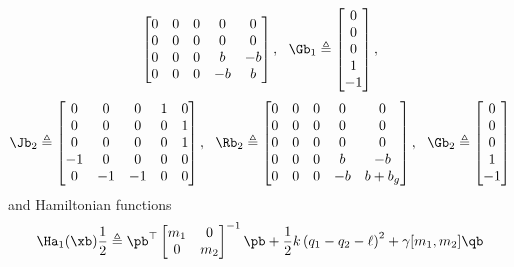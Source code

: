 \begin{exmp}
\begin{equation}
\begin{bmatrix}
            0&0&0&0&0\\
            0&0&0&0&0\\
            0&0&0&b&-b\\
            0&0&0&-b&b\\
        \end{bmatrix},~~
        \Gb_1\triangleq
        \begin{bmatrix}
            0\\0\\0\\1\\-1
        \end{bmatrix},
    \end{equation}
    \begin{equation}
        \Jb_2\triangleq
        \begin{bmatrix}
            0&0&0&1&0\\
            0&0&0&0&1\\
            0&0&0&0&1\\
            -1&0&0&0&0\\
            0&-1&-1&0&0\\
        \end{bmatrix},~~
        \Rb_2\triangleq
        \begin{bmatrix}
            0&0&0&0&0\\
            0&0&0&0&0\\
            0&0&0&0&0\\
            0&0&0&b&-b\\
            0&0&0&-b&b+b_g\\
        \end{bmatrix},~~
        \Gb_2\triangleq
        \begin{bmatrix}
            0\\0\\0\\1\\-1
        \end{bmatrix}
    \end{equation}
    and Hamiltonian functions
    \begin{align}
        &\Ha_1(\xb) \frac{1}{2}\triangleq \pb^\top\begin{bmatrix}m_1&0\\0&m_2\end{bmatrix}^{-1}\pb + \frac{1}{2}k\left(q_1-q_2-\ell\right)^2 + \gamma[m_1,m_2]\qb \\

\end{align}
\end{exmp}

